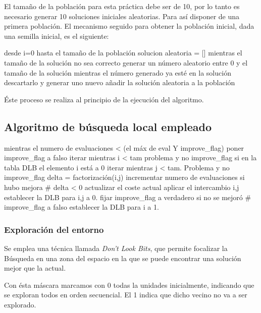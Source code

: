 \documentclass[twoside]{article}
\begin{document}
El tamaño de la población para esta práctica debe ser de 10, por lo tanto
es necesario generar 10 soluciones iniciales aleatorias. Para así disponer
de una primera población. El mecanismo seguido para obtener la población
inicial, dada una semilla inicial, es el siguiente:

\begin{pythoncode}
desde i=0 hasta el tamaño de la población
    solucion aleatoria = []
    mientras el tamaño de la solución no sea correcto
        generar un número aleatorio entre 0 y el tamaño de la solución
            mientras el número generado ya esté en la solución
                descartarlo y generar uno nuevo
    añadir la solución aleatoria a la población
\end{pythoncode}

Éste proceso se realiza al principio de la ejecución del algoritmo.

\subsection{Algoritmo de búsqueda local empleado}

\begin{pythoncode}
mientras el numero de evaluaciones < (el máx de eval Y improve_flag)
    poner improve_flag a falso
    iterar mientras i < tam problema y no improve_flag
        si en la tabla DLB el elemento i está a 0
            iterar mientras j < tam. Problema y no improve_flag
                delta = factorización(i,j)
                incrementar numero de evaluaciones
                si hubo mejora # delta < 0
                    actualizar el coste actual
                    aplicar el intercambio i,j
                    establecer la DLB para i,j a 0.
                    fijar improve_flag a verdadero
            si no se mejoró # improve_flag a falso
                establecer la DLB para i a 1.
\end{pythoncode}

\subsubsection{Exploración del entorno}

Se emplea una técnica llamada \textit{Don't Look Bits}, que permite focalizar la Búsqueda en una zona del espacio en la que se puede encontrar una solución mejor que la actual.

Con ésta máscara marcamos con 0 todas la unidades inicialmente, indicando que se exploran todos en  orden secuencial. El 1 indica que dicho vecino no va a ser explorado.
\end{document}
